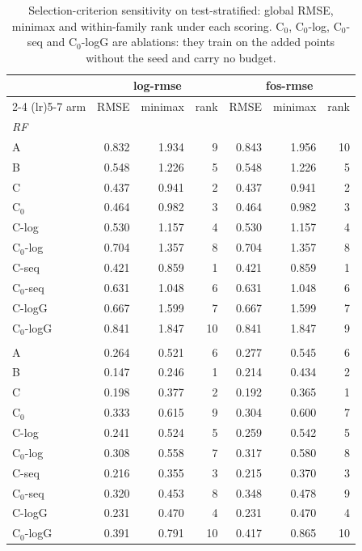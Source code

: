 \begin{table}[htbp]
\centering
\caption{Selection-criterion sensitivity on test-stratified: global RMSE, minimax and within-family rank under each scoring. C$_0$, C$_0$-log, C$_0$-seq and C$_0$-logG are ablations: they train on the added points without the seed and carry no budget.}
\label{tab:test-stratified:scorings}
\begin{tabular}{lrrrrrr}
\toprule
 & \multicolumn{3}{c}{log-rmse} & \multicolumn{3}{c}{fos-rmse} \\
\cmidrule(lr){2-4} \cmidrule(lr){5-7}
arm & RMSE & minimax & rank & RMSE & minimax & rank \\
\midrule
\multicolumn{7}{l}{\textit{RF}} \\
A & 0.832 & 1.934 & 9 & 0.843 & 1.956 & 10 \\
B & 0.548 & 1.226 & 5 & 0.548 & 1.226 & 5 \\
C & 0.437 & 0.941 & 2 & 0.437 & 0.941 & 2 \\
C$_0$ & 0.464 & 0.982 & 3 & 0.464 & 0.982 & 3 \\
C-log & 0.530 & 1.157 & 4 & 0.530 & 1.157 & 4 \\
C$_0$-log & 0.704 & 1.357 & 8 & 0.704 & 1.357 & 8 \\
C-seq & 0.421 & 0.859 & 1 & 0.421 & 0.859 & 1 \\
C$_0$-seq & 0.631 & 1.048 & 6 & 0.631 & 1.048 & 6 \\
C-logG & 0.667 & 1.599 & 7 & 0.667 & 1.599 & 7 \\
C$_0$-logG & 0.841 & 1.847 & 10 & 0.841 & 1.847 & 9 \\
\addlinespace
\multicolumn{7}{l}{\textit{GBM}} \\
A & 0.264 & 0.521 & 6 & 0.277 & 0.545 & 6 \\
B & 0.147 & 0.246 & 1 & 0.214 & 0.434 & 2 \\
C & 0.198 & 0.377 & 2 & 0.192 & 0.365 & 1 \\
C$_0$ & 0.333 & 0.615 & 9 & 0.304 & 0.600 & 7 \\
C-log & 0.241 & 0.524 & 5 & 0.259 & 0.542 & 5 \\
C$_0$-log & 0.308 & 0.558 & 7 & 0.317 & 0.580 & 8 \\
C-seq & 0.216 & 0.355 & 3 & 0.215 & 0.370 & 3 \\
C$_0$-seq & 0.320 & 0.453 & 8 & 0.348 & 0.478 & 9 \\
C-logG & 0.231 & 0.470 & 4 & 0.231 & 0.470 & 4 \\
C$_0$-logG & 0.391 & 0.791 & 10 & 0.417 & 0.865 & 10 \\
\bottomrule
\end{tabular}
\end{table}
